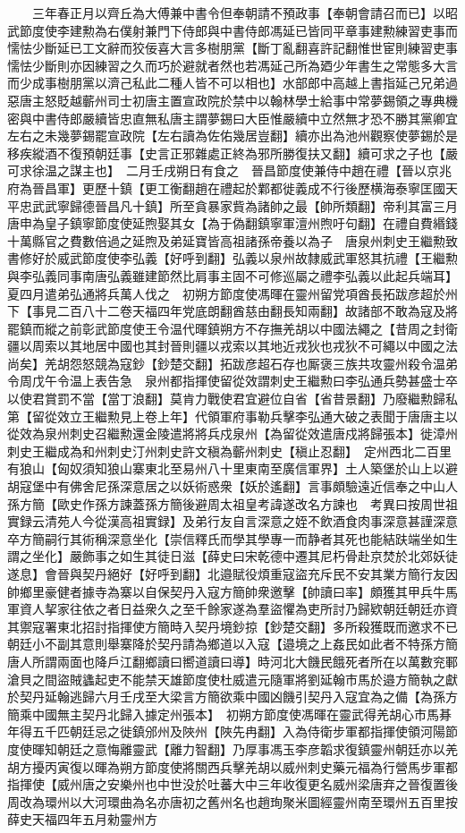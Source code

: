 　　三年春正月以齊丘為大傅兼中書令但奉朝請不預政事【奉朝會請召而已】以昭武節度使李建勲為右僕射兼門下侍郎與中書侍郎馮延已皆同平章事建勲練習吏事而懦怯少斷延已工文辭而狡佞喜大言多樹朋黨【斷丁亂翻喜許記翻惟世宦則練習吏事懦怯少斷則亦因練習之久而巧於避就者然也若馮延己所為廼少年書生之常態多大言而少成事樹朋黨以濟己私此二種人皆不可以相也】水部郎中高越上書指延己兄弟過惡唐主怒貶越蘄州司士初唐主置宣政院於禁中以翰林學士給事中常夢錫領之專典機密與中書侍郎嚴續皆忠直無私唐主謂夢錫曰大臣惟嚴續中立然無才恐不勝其黨卿宜左右之未幾夢錫罷宣政院【左右讀為佐佑幾居豈翻】續亦出為池州觀察使夢錫於是移疾縱酒不復預朝廷事【史言正邪雜處正終為邪所勝復扶又翻】續可求之子也【嚴可求徐温之謀主也】　二月壬戌朔日有食之　晉昌節度使兼侍中趙在禮【晉以京兆府為晉昌軍】更歷十鎮【更工衡翻趙在禮起於鄴都徙義成不行後歷横海泰寧匡國天平忠武武寧歸德晉昌凡十鎮】所至貪暴家貲為諸帥之最【帥所類翻】帝利其富三月唐申為皇子鎮寧節度使延煦娶其女【為于偽翻鎮寧軍澶州煦吁句翻】在禮自費緡錢十萬縣官之費數倍過之延煦及弟延寶皆高祖諸孫帝養以為子　唐泉州刺史王繼勲致書修好於威武節度使李弘義【好呼到翻】弘義以泉州故隸威武軍怒其抗禮【王繼勲與李弘義同事南唐弘義雖建節然比肩事主固不可修巡屬之禮李弘義以此起兵端耳】夏四月遣弟弘通將兵萬人伐之　初朔方節度使馮暉在靈州留党項酋長拓跋彦超於州下【事見二百八十二卷天福四年党底朗翻酋慈由翻長知兩翻】故諸部不敢為寇及將罷鎮而縱之前彰武節度使王令温代暉鎮朔方不存撫羌胡以中國法繩之【昔周之封衛疆以周索以其地居中國也其封晉則疆以戎索以其地近戎狄也戎狄不可繩以中國之法尚矣】羌胡怨怒競為寇鈔【鈔楚交翻】拓跋彦超石存也厮褒三族共攻靈州殺令温弟令周戊午令温上表告急　泉州都指揮使留從效謂刺史王繼勲曰李弘通兵勢甚盛士卒以使君賞罰不當【當丁浪翻】莫肯力戰使君宜避位自省【省昔景翻】乃廢繼勲歸私第【留從效立王繼勲見上卷上年】代領軍府事勒兵擊李弘通大破之表聞于唐唐主以從效為泉州刺史召繼勲還金陵遣將將兵戍泉州【為留從效遣唐戍將歸張本】徙漳州刺史王繼成為和州刺史汀州刺史許文稹為蘄州刺史【稹止忍翻】　定州西北二百里有狼山【匈奴須知狼山寨東北至易州八十里東南至廣信軍界】土人築堡於山上以避胡寇堡中有佛舍尼孫深意居之以妖術惑衆【妖於遙翻】言事頗驗遠近信奉之中山人孫方簡【歐史作孫方諫蓋孫方簡後避周太祖皇考諱遂改名方諫也　考異曰按周世祖實録云清苑人今從漢高祖實録】及弟行友自言深意之姪不飲酒食肉事深意甚謹深意卒方簡嗣行其術稱深意坐化【崇信釋氏而學其學專一而静者其死也能結趺端坐如生謂之坐化】嚴飾事之如生其徒日滋【薛史曰宋乾德中遷其尼朽骨赴京焚於北郊妖徒遂息】會晉與契丹絕好【好呼到翻】北邉賦役煩重寇盜充斥民不安其業方簡行友因帥鄉里豪健者據寺為寨以自保契丹入寇方簡帥衆邀擊【帥讀曰率】頗獲其甲兵牛馬軍資人挈家往依之者日益衆久之至千餘家遂為羣盜懼為吏所討乃歸欵朝廷朝廷亦資其禦寇署東北招討指揮使方簡時入契丹境鈔掠【鈔楚交翻】多所殺獲既而邀求不已朝廷小不副其意則舉寨降於契丹請為鄉道以入寇【邉境之上姦民如此者不特孫方簡唐人所謂兩面也降戶江翻鄉讀曰嚮道讀曰導】時河北大饑民餓死者所在以萬數兖鄆滄貝之間盜賊蠭起吏不能禁天雄節度使杜威遣元隨軍將劉延翰市馬於邉方簡執之獻於契丹延翰逃歸六月壬戌至大梁言方簡欲乘中國凶饑引契丹入寇宜為之備【為孫方簡乘中國無主契丹北歸入據定州張本】　初朔方節度使馮暉在靈武得羌胡心市馬朞年得五千匹朝廷忌之徙鎮邠州及陜州【陜先冉翻】入為侍衛步軍都指揮使領河陽節度使暉知朝廷之意悔離靈武【離力智翻】乃厚事馮玉李彦韜求復鎮靈州朝廷亦以羌胡方擾丙寅復以暉為朔方節度使將關西兵擊羌胡以威州刺史藥元福為行營馬步軍都指揮使【威州唐之安樂州也中世没於吐蕃大中三年收復更名威州梁唐弃之晉復置後周改為環州以大河環曲為名亦唐初之舊州名也趙珣聚米圖經靈州南至環州五百里按薛史天福四年五月勑靈州方